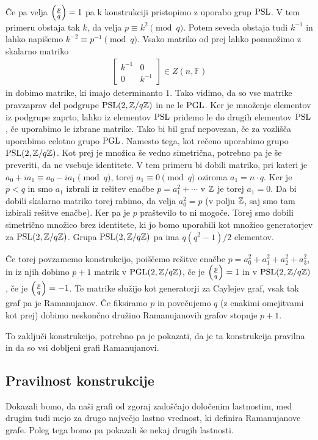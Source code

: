 Če pa velja \(\left(\frac{p}{q}\right) = 1\) pa k konstrukciji pristopimo z uporabo grup \(\operatorname{PSL}\). V tem primeru obstaja tak \(k\), da velja \(p\equiv k^2 \pmod q\). Potem seveda obstaja tudi \(k^{-1}\) in lahko napišemo \(k^{-2} \equiv p^{-1}\pmod q\). Vsako matriko od prej lahko pomnožimo z skalarno matriko
\begin{align*}
    \begin{bmatrix}
        k^{-1} & 0 \\
        0 & k^{-1}
    \end{bmatrix}\in Z(n, \mathbb F)
\end{align*}
in dobimo matrike, ki imajo determinanto \(1\). Tako vidimo, da so vse matrike pravzaprav del podgrupe \(\operatorname{PSL}(2, \mathbb Z/q\mathbb Z)\) in ne le \(\operatorname{PGL}\). Ker je množenje elementov iz podgrupe zaprto, lahko iz elementov \(\operatorname{PSL}\) pridemo le do drugih elementov \(\operatorname{PSL}\), če uporabimo le izbrane matrike. Tako bi bil graf nepovezan, če za vozlišča uporabimo celotno grupo \(\operatorname{PGL}\). Namesto tega, kot rečeno uporabimo grupo \(\operatorname{PSL}(2, \mathbb Z/q\mathbb Z)\). Kot prej je množica še vedno simetrična, potrebno pa je še preveriti, da ne vsebuje identitete. V tem primeru bi dobili matriko, pri kateri je \(a_0 +ia_1 \equiv a_0 - ia_1 \pmod q\), torej \(a_1 \equiv 0 \pmod q\) oziroma \(a_1 = n\cdot q\). Ker je \(p<q\) in smo \(a_1\) izbrali iz rešitev enačbe \(p=a_1^2 + \cdots\) v \(\mathbb Z\) je torej \(a_1=0\). Da bi dobili skalarno matriko torej rabimo, da velja \(a_0^2 = p\) (v polju \(\mathbb Z\), saj smo tam izbirali rešitve enačbe). Ker pa je \(p\) praštevilo to ni mogoče. Torej smo dobili simetrično množico brez identitete, ki jo bomo uporabili kot množico generatorjev za \(\operatorname{PSL}(2, \mathbb Z/q\mathbb Z)\). Grupa \(\operatorname{PSL}(2, \mathbb Z/q\mathbb Z)\) pa ima \(q(q^2-1)/2\) elementov.

Če torej povzamemo konstrukcijo, poiščemo rešitve enačbe \(p = a_0^2 + a_1^2 + a_2^2 + a_3^2\), in iz njih dobimo \(p+1\) matrik v \(\operatorname{PGL}(2, \mathbb Z/q\mathbb Z)\), če je \(\left(\frac{p}{q}\right)=1\) in v \(\operatorname{PSL}(2, \mathbb Z/q\mathbb Z)\), če je \(\left(\frac{p}{q}\right)=-1\). Te matrike služijo kot generatorji za Caylejev graf, vsak tak graf pa je Ramanujanov. Če fiksiramo \(p\) in povečujemo \(q\) (z enakimi omejitvami kot prej) dobimo neskončno družino Ramanujanovih grafov stopnje \(p+1\).

To zaključi konstrukcijo, potrebno pa je pokazati, da je ta konstrukcija pravilna in da so vsi dobljeni grafi Ramanujanovi.

\subsection{Pravilnost konstrukcije}
Dokazali bomo, da naši grafi od zgoraj zadoščajo določenim lastnostim, med drugim tudi mejo za drugo največjo lastno vrednost, ki definira Ramanujanove grafe. Poleg tega bomo pa pokazali še nekaj drugih lastnosti.

